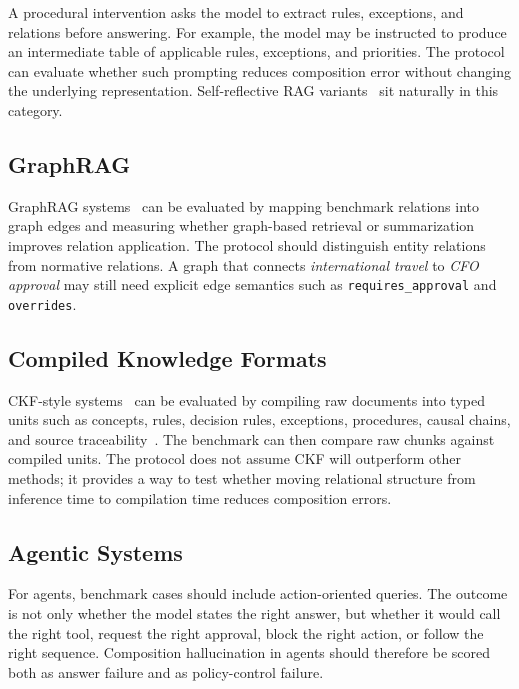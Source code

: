 \documentclass[11pt]{article}
\begin{document}
A procedural intervention asks the model to extract rules, exceptions, and relations before answering. For example, the model may be instructed to produce an intermediate table of applicable rules, exceptions, and priorities. The protocol can evaluate whether such prompting reduces composition error without changing the underlying representation. Self-reflective RAG variants~\cite{asai2024selfrag} sit naturally in this category.

\subsection{GraphRAG}

GraphRAG systems~\cite{edge2024graphrag} can be evaluated by mapping benchmark relations into graph edges and measuring whether graph-based retrieval or summarization improves relation application. The protocol should distinguish entity relations from normative relations. A graph that connects \emph{international travel} to \emph{CFO approval} may still need explicit edge semantics such as \texttt{requires\_approval} and \texttt{overrides}.

\subsection{Compiled Knowledge Formats}

CKF-style systems~\cite{tomazinho2026ckf} can be evaluated by compiling raw documents into typed units such as concepts, rules, decision rules, exceptions, procedures, causal chains, and source traceability~\cite{davis1993kr,bernerslee2001semantic}. The benchmark can then compare raw chunks against compiled units. The protocol does not assume CKF will outperform other methods; it provides a way to test whether moving relational structure from inference time to compilation time reduces composition errors.

\subsection{Agentic Systems}

For agents, benchmark cases should include action-oriented queries. The outcome is not only whether the model states the right answer, but whether it would call the right tool, request the right approval, block the right action, or follow the right sequence. Composition hallucination in agents should therefore be scored both as answer failure and as policy-control failure.
\end{document}
